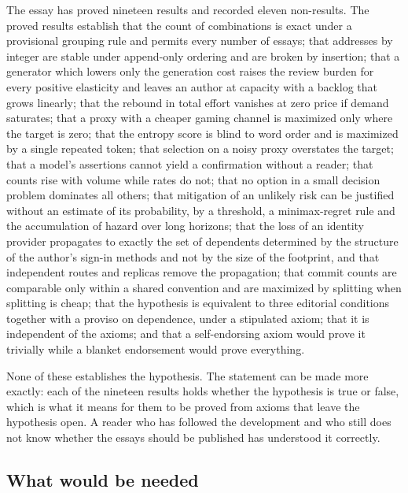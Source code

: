 \documentclass[11pt]{article}
\theoremstyle{plain}
\theoremstyle{definition}
\theoremstyle{remark}
\begin{document}
The essay has proved nineteen results and recorded eleven non-results. The proved results establish that the count of combinations is exact under a provisional grouping rule and permits every number of essays; that addresses by integer are stable under append-only ordering and are broken by insertion; that a generator which lowers only the generation cost raises the review burden for every positive elasticity and leaves an author at capacity with a backlog that grows linearly; that the rebound in total effort vanishes at zero price if demand saturates; that a proxy with a cheaper gaming channel is maximized only where the target is zero; that the entropy score is blind to word order and is maximized by a single repeated token; that selection on a noisy proxy overstates the target; that a model's assertions cannot yield a confirmation without a reader; that counts rise with volume while rates do not; that no option in a small decision problem dominates all others; that mitigation of an unlikely risk can be justified without an estimate of its probability, by a threshold, a minimax-regret rule and the accumulation of hazard over long horizons; that the loss of an identity provider propagates to exactly the set of dependents determined by the structure of the author's sign-in methods and not by the size of the footprint, and that independent routes and replicas remove the propagation; that commit counts are comparable only within a shared convention and are maximized by splitting when splitting is cheap; that the hypothesis is equivalent to three editorial conditions together with a proviso on dependence, under a stipulated axiom; that it is independent of the axioms; and that a self-endorsing axiom would prove it trivially while a blanket endorsement would prove everything.

None of these establishes the hypothesis. The statement can be made more exactly: each of the nineteen results holds whether the hypothesis is true or false, which is what it means for them to be proved from axioms that leave the hypothesis open. A reader who has followed the development and who still does not know whether the essays should be published has understood it correctly.

\subsection{What would be needed}
\end{document}
